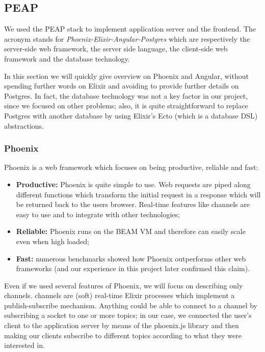 \subsection{PEAP}
We used the PEAP stack to implement application server and the frontend.
The acronym stands for
\textit{Phoenix-Elixir-Angular-Postgres} which are respectively the
server-side web framework, the server side language,
the client-side web framework and the
database technology.

In this section we will quickly give overview on Phoenix and Angular, without
spending further words on Elixir and avoiding to provide further details on
Postgres. In fact, the database technology was not a key factor in our project,
since we focused on other problems; also, it is quite straightforward to
replace Postgres with another database by using Elixir's Ecto (which is a
database DSL) abstractions.

\subsubsection{Phoenix}

Phoenix is a web framework which focuses on being productive,
reliable and fast:

\begin{itemize}
  \item \textbf{Productive:} Phoenix is quite simple to use.
    Web requests are piped along different functions which
    transform the initial request in a response which will be returned back to
    the users browser. Real-time features like channels are easy to use and to
    integrate with other technologies;
  \item \textbf{Reliable:} Phoenix runs on the BEAM VM and therefore can easily
    scale even when high loaded;
  \item \textbf{Fast:} numerous benchmarks showed how Phoenix outperforms other
    web frameworks (and our experience in this project later confirmed this
    claim).
\end{itemize}

Even if we used several features of Phoenix, we will focus on describing only
channels. channels are (soft) real-time Elixir processes which
implement a publish-subscribe mechanism.
Anything could be able to connect to a channel by subscribing a socket to one
or more topics; in our case, we connected the user's client to the application
server by means of the phoenix.js library and then making our clients subscribe
to different topics according to what they were interested in.

